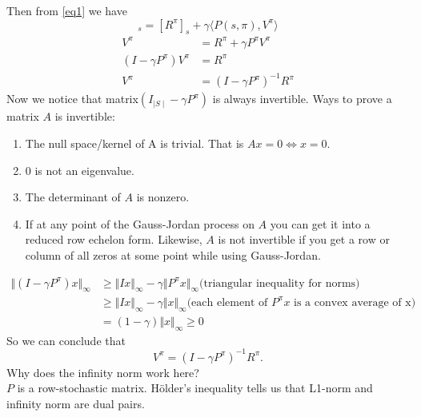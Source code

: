 \documentclass{report}
\begin{document}
Then from \ref{eq1} we have
\begin{equation}
    [V^{\pi}]_s=[R^{\pi}]_s+\gamma \langle P(s,\pi),V^{\pi}\rangle
\end{equation}
\begin{align*}
V^{\pi} &=  R^{\pi}+\gamma P^{\pi}V^{\pi} \\ 
(I-\gamma P^{\pi})V^{\pi} &=  R^{\pi} \\
V^{\pi} &= (I-\gamma P^{\pi})^{-1}R^{\pi} 
\end{align*}   
Now we notice that matrix$(I_{\mid S \mid}-\gamma P^{\pi})$ is always invertible.  
Ways to prove a matrix $A$ is invertible:
\begin{enumerate}
    \item The null space/kernel of  A  is trivial. That is $Ax=0 \iff x=0$.
    \item $0$ is not an eigenvalue.
    \item The determinant of $A$ is nonzero.
    \item If at any point of the Gauss-Jordan process on $A$ you can get it into a reduced row echelon form. Likewise,  $A$ is not invertible if you get a row or column of all zeros at some point while using Gauss-Jordan.
\end{enumerate}

\begin{equation}
\begin{split}
    \Vert(I-\gamma P^{\pi})x\Vert_{\infty}
    &\geq \Vert Ix \Vert_{\infty} -\gamma \Vert P^{\pi} x \Vert_{\infty} \text{(triangular inequality for norms)} \\
    &\geq \Vert Ix \Vert_{\infty} - \gamma \Vert x \Vert_{\infty} \text{(each element of $P^{\pi}x$ is a convex average of x)} \\
   & = (1-\gamma)\Vert x \Vert_{\infty} \geq 0
\end{split}
\end{equation}
So we can conclude that 
\begin{equation}
    V^{\pi}=(I-\gamma P^{\pi})^{-1}R^{\pi}.
\end{equation}
Why does the infinity norm work here?\\
$P$ is a row-stochastic matrix. 
Hölder's inequality tells us that L1-norm and infinity norm are dual pairs.
\end{document}
